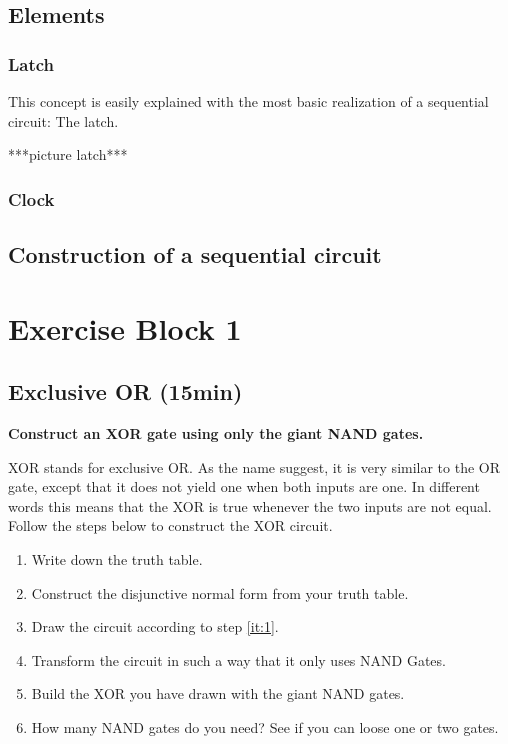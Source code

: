 \documentclass[10pt,a4paper]{article}
\begin{document}
\subsection{Elements}
\subsubsection{Latch}
This concept is easily explained with the most basic realization of a sequential circuit: The latch. 

***picture latch***


\subsubsection{Clock}
\subsection{Construction of a sequential circuit}


\newpage
\section{Exercise Block 1}

\subsection{Exclusive OR (15min)}\label{subsec:ex-1}
\textbf{Construct an XOR gate using only the giant NAND gates.}

 XOR stands for exclusive OR. As the name suggest, it is very similar to the OR gate, except that it does not yield one when both inputs are one. In different words this means that the XOR is true whenever the two inputs are not equal. Follow the steps below to construct the XOR circuit.
\begin{enumerate}
	\item Write down the truth table.
	\item\label{it:1} Construct the disjunctive normal form from your truth table.
	\item Draw the circuit according to step \ref{it:1}.
	\item Transform the circuit in such a way that it only uses NAND Gates.
	\item Build the XOR you have drawn with the giant NAND gates.
	\item How many NAND gates do you need? See if you can loose one or two gates.
\end{enumerate}
\end{document}
